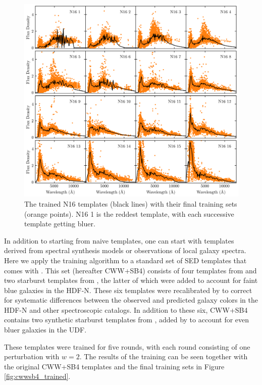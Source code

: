 \begin{figure}
    \centering
    \includegraphics{figures/N16_trained.png}
    \caption{The trained N16 templates (black lines) with their final training sets (orange points). N16 1 is the reddest template, with each successive template getting bluer. }
    \label{fig:N16_trained}
\end{figure}

In addition to starting from naive templates, one can start with templates derived from spectral synthesis models or observations of local galaxy spectra. 
Here we apply the training algorithm to a standard set of SED templates that comes with \bpz.
This set (hereafter CWW+SB4) consists of four templates from \citet{Coleman1980a} and two starburst templates from \citet{Kinney1996a}, the latter of which were added to account for faint blue galaxies in the HDF-N. 
These six templates were recalibrated by \citet{Benitez2004a} to correct for systematic differences between the observed and predicted galaxy colors in the HDF-N and other spectroscopic catalogs. 
In addition to these six, CWW+SB4 contains two synthetic starburst templates from \citet{Bruzual2003b}, added by \citet{Coe2006a} to account for even bluer galaxies in the UDF.

These templates were trained for five rounds, with each round consisting of one perturbation with $w=2$. 
The results of the training can be seen together with the original CWW+SB4 templates and the final training sets in Figure \ref{fig:cwwsb4_trained}. 

